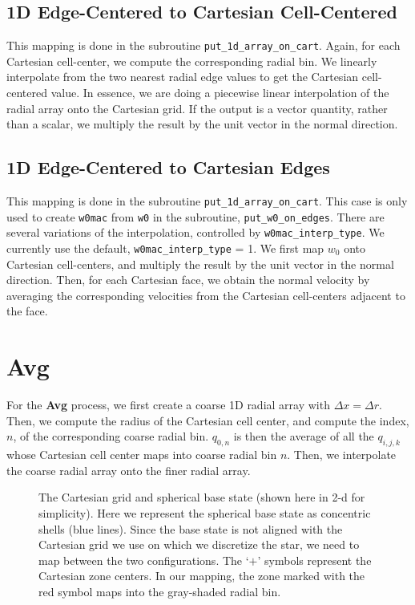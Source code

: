 \subsection{1D Edge-Centered to Cartesian Cell-Centered}
This mapping is done in the subroutine {\tt put\_1d\_array\_on\_cart}.
Again, for each Cartesian cell-center, we compute the corresponding radial
bin.  We linearly interpolate from the two nearest radial edge values 
to get the Cartesian cell-centered value.  In essence,
we are doing a piecewise linear interpolation of the radial array onto the 
Cartesian grid.  If the output is a vector quantity, rather than a scalar, we
multiply the result by the unit vector in the normal direction.
\subsection{1D Edge-Centered to Cartesian Edges}
This mapping is done in the subroutine {\tt put\_1d\_array\_on\_cart}.
This case is only used to create {\tt w0mac} from {\tt w0} in the 
subroutine, {\tt put\_w0\_on\_edges}.  There are several variations 
of the interpolation, controlled by {\tt w0mac\_interp\_type}.  We 
currently use the default, {\tt w0mac\_interp\_type} = 1.  We first 
map $w_0$ onto Cartesian cell-centers, and multiply the result by 
the unit vector in the normal direction.  Then, for each Cartesian 
face, we obtain the normal velocity by averaging the corresponding 
velocities from the Cartesian cell-centers adjacent to the face.
\section{Avg}\label{Sec:Avg}
For the {\bf Avg} process, we first create a coarse 1D radial array 
with $\Delta x = \Delta r$.  Then, we compute the radius of the Cartesian cell 
center, and compute the index, $n$, of the corresponding coarse radial 
bin.  $q_{0,n}$ is then the average of all the $q_{i,j,k}$ whose 
Cartesian cell center maps into coarse radial bin $n$.  Then, we 
interpolate the coarse radial array onto the finer radial array.

\clearpage

\begin{figure}[tpb]
\begin{center}
\caption{\label{fig:mapping} The Cartesian grid and spherical base
state (shown here in 2-d for simplicity).  Here we represent the
spherical base state as concentric shells (blue lines).  Since the
base state is not aligned with the Cartesian grid we use on which
we discretize the star, we need to map between the two configurations.
The `$+$' symbols represent the Cartesian zone centers.  In our
mapping, the zone marked with the red symbol maps into the gray-shaded
radial bin. }
\label{fig:mapping}
\end{center}
\end{figure}
